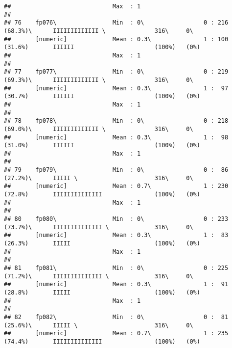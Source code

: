 \documentclass[]{article}
\begin{document}
\begin{verbatim}
##                             Max  : 1                                                                                       
## 
## 76    fp076\                Min  : 0\                 0 : 216 (68.3%)\      IIIIIIIIIIIII \              316\     0\       
##       [numeric]             Mean : 0.3\               1 : 100 (31.6%)       IIIIII                       (100%)   (0%)     
##                             Max  : 1                                                                                       
## 
## 77    fp077\                Min  : 0\                 0 : 219 (69.3%)\      IIIIIIIIIIIII \              316\     0\       
##       [numeric]             Mean : 0.3\               1 :  97 (30.7%)       IIIIII                       (100%)   (0%)     
##                             Max  : 1                                                                                       
## 
## 78    fp078\                Min  : 0\                 0 : 218 (69.0%)\      IIIIIIIIIIIII \              316\     0\       
##       [numeric]             Mean : 0.3\               1 :  98 (31.0%)       IIIIII                       (100%)   (0%)     
##                             Max  : 1                                                                                       
## 
## 79    fp079\                Min  : 0\                 0 :  86 (27.2%)\      IIIII \                      316\     0\       
##       [numeric]             Mean : 0.7\               1 : 230 (72.8%)       IIIIIIIIIIIIII               (100%)   (0%)     
##                             Max  : 1                                                                                       
## 
## 80    fp080\                Min  : 0\                 0 : 233 (73.7%)\      IIIIIIIIIIIIII \             316\     0\       
##       [numeric]             Mean : 0.3\               1 :  83 (26.3%)       IIIII                        (100%)   (0%)     
##                             Max  : 1                                                                                       
## 
## 81    fp081\                Min  : 0\                 0 : 225 (71.2%)\      IIIIIIIIIIIIII \             316\     0\       
##       [numeric]             Mean : 0.3\               1 :  91 (28.8%)       IIIII                        (100%)   (0%)     
##                             Max  : 1                                                                                       
## 
## 82    fp082\                Min  : 0\                 0 :  81 (25.6%)\      IIIII \                      316\     0\       
##       [numeric]             Mean : 0.7\               1 : 235 (74.4%)       IIIIIIIIIIIIII               (100%)   (0%)     

\end{verbatim}
\end{document}
